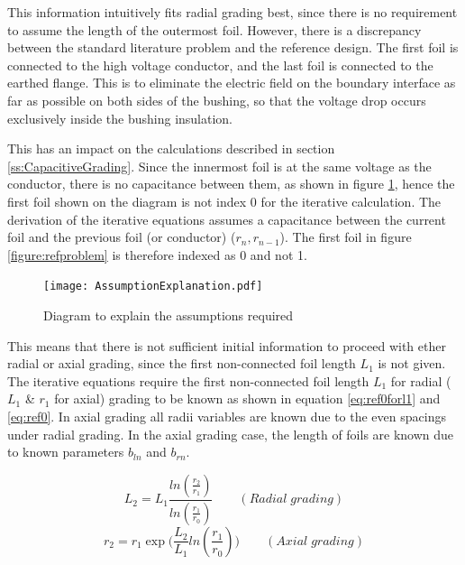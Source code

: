 This information intuitively fits radial grading best, since there is no requirement to assume the length of the outermost foil.
However, there is a discrepancy between the standard literature problem and the reference design.
The first foil is connected to the high voltage conductor, and the last foil is connected to the earthed flange.
This is to eliminate the electric field on the boundary interface as far as possible on both sides of the bushing, so that the voltage drop occurs exclusively inside the bushing insulation.

This has an impact on the calculations described in section \ref{ss:CapacitiveGrading}.
Since the innermost foil is at the same voltage as the conductor, there is no capacitance between them, as shown in figure \ref{figure:required assumptions}, hence the first foil shown on the diagram is not index 0 for the iterative calculation.
The derivation of the iterative equations assumes a capacitance between the current foil and the previous foil (or conductor) ($r_n,r_{n-1}$). 
The first foil in figure \ref{figure:refproblem} is therefore indexed as 0 and not 1.

\begin{figure}[!h]
   \centering
   \texttt{[image: AssumptionExplanation.pdf]}
   \caption{Diagram to explain the assumptions required}
   \label{figure:required assumptions}
\end{figure}

This means that there is not sufficient initial information to proceed with ether radial or axial grading, since the first non-connected foil length $L_1$ is not given.
The iterative equations require the first non-connected foil length $L_1$ for radial ( $L_1$ \& $r_1$ for axial) grading to be known as shown in equation \ref{eq:ref0forl1} and \ref{eq:ref0}. 
In axial grading all radii variables are known due to the even spacings under radial grading. In the axial grading case, the length of foils are known due to known parameters $b_{ln}$ and $b_{rn}$.

\begin{equation}
   \label{eq:ref0forl1}
   L_{2} = L_{1}\displaystyle\frac{{ln(\displaystyle\frac{r_{2}}{r_{1}})} }{ln(\displaystyle\frac{r_{1}}{r_{0}})} \qquad (Radial \; grading)
\end{equation}
\begin{equation}
  \label{eq:ref0}
  \displaystyle r_2= \displaystyle  r_{1} \displaystyle \exp\big( \displaystyle  \frac{L_2}{L_{1}}ln(\displaystyle \frac{r_1}{r_0})\big) \qquad (Axial \; grading)
\end{equation}




